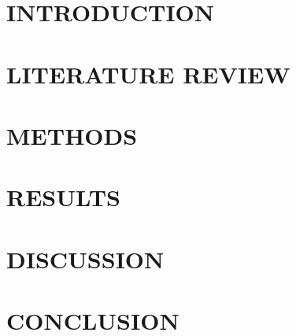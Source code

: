 

 

\chapter{INTRODUCTION}


\chapter{LITERATURE REVIEW}


\chapter{METHODS}


\chapter{RESULTS}



\chapter{DISCUSSION}


\chapter{CONCLUSION}










		
		